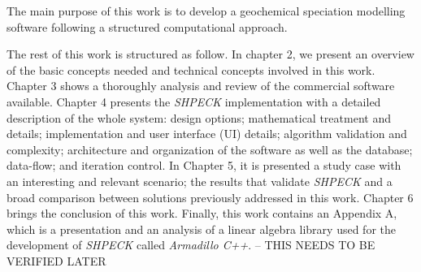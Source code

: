 The main purpose of this work is to develop a geochemical speciation modelling software following a structured computational approach. 


The rest of this work is structured as follow. In chapter 2, we present an overview of the basic concepts needed and technical concepts involved in this work. Chapter 3 shows a thoroughly analysis and review of the commercial software available. Chapter 4 presents the \emph{SHPECK} implementation with a detailed description of the whole system: design options; mathematical treatment and details; implementation and user interface (UI) details; algorithm validation and complexity; architecture and organization of the software as well as the database; data-flow; and iteration control. In Chapter 5, it is presented a study case with an interesting and relevant scenario; the results that validate \emph{SHPECK} and a broad comparison between solutions previously addressed in this work. Chapter 6 brings the conclusion of this work. Finally, this work contains an Appendix A, which is a presentation and an analysis of a linear algebra library used for the development of \emph{SHPECK} called \emph{Armadillo C++}. -- THIS NEEDS TO BE VERIFIED LATER
